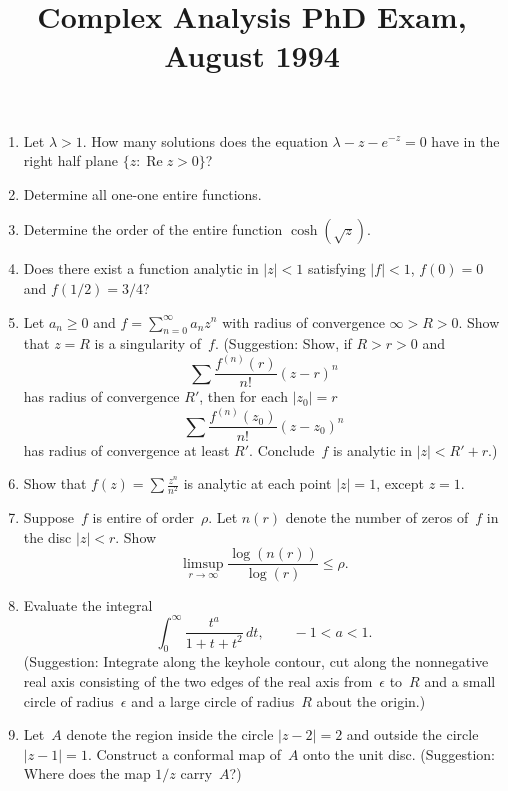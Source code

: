 \documentclass[11pt,letterpaper]{article}
\title{Complex Analysis PhD Exam, August 1994}
\author{}
\date{}
\newenvironment{examproblems}[2]{%
  \def\ProblemHeadingTag{#2}%
  \AssignTaggingSocketPlug{block/list/label}{examproblem}%
  \begin{enumerate}%
  \setcounter{enumi}{#1}%
  \renewcommand{\labelenumi}{\textbf{\theenumi.}}%
  \setlength{\topsep}{0.35em}%
  \setlength{\partopsep}{0pt}%
  \setlength{\itemsep}{0.48em}%
  \setlength{\parsep}{0.18em}%
}{\end{enumerate}}
\begin{document}
\maketitle
\thispagestyle{empty}
\begin{examproblems}{0}{H2}
\def\ProblemHeadingText{Problem 1.}
\item
Let \(\lambda>1\). How many solutions does the equation \(\lambda-z-e^{-z}=0\) have in the right half plane \(\{z:\operatorname{Re}z>0\}\)?
\def\ProblemHeadingText{Problem 2.}
\item
Determine all one-one entire functions.
\def\ProblemHeadingText{Problem 3.}
\item
Determine the order of the entire function \(\cosh(\sqrt{z})\).
\def\ProblemHeadingText{Problem 4.}
\item
Does there exist a function analytic in \(|z|<1\) satisfying \(|f|<1\), \(f(0)=0\) and \(f(1/2)=3/4\)?
\def\ProblemHeadingText{Problem 5.}
\item
Let \(a_n\geq 0\) and \(f=\sum_{n=0}^{\infty}a_nz^n\) with radius of convergence \(\infty>R>0\). Show that \(z=R\) is a singularity of~\(f\). (Suggestion: Show, if \(R>r>0\) and
\[
\sum \frac{f^{(n)}(r)}{n!}(z-r)^n
\]
 has radius of convergence \(R'\), then for each \(|z_0|=r\)
\[
\sum \frac{f^{(n)}(z_0)}{n!}(z-z_0)^n
\]
 has radius of convergence at least \(R'\). Conclude~\(f\) is analytic in \(|z|<R'+r\).)
\def\ProblemHeadingText{Problem 6.}
\item
Show that \(f(z)=\sum \frac{z^n}{n^2}\) is analytic at each point \(|z|=1\), except \(z=1\).
\def\ProblemHeadingText{Problem 7.}
\item
Suppose~\(f\) is entire of order~\(\rho\). Let \(n(r)\) denote the number of zeros of~\(f\) in the disc \(|z|<r\). Show
\[
\limsup_{r\to\infty}\frac{\log(n(r))}{\log(r)}\leq\rho.
\]
\def\ProblemHeadingText{Problem 8.}
\item
Evaluate the integral
\[
\int_0^\infty \frac{t^a}{1+t+t^2}\,dt,\qquad -1<a<1.
\]
 (Suggestion: Integrate along the keyhole contour, cut along the nonnegative real axis consisting of the two edges of the real axis from~\(\epsilon\) to~\(R\) and a small circle of radius~\(\epsilon\) and a large circle of radius~\(R\) about the origin.)
\def\ProblemHeadingText{Problem 9.}
\item
Let~\(A\) denote the region inside the circle \(|z-2|=2\) and outside the circle \(|z-1|=1\). Construct a conformal map of~\(A\) onto the unit disc. (Suggestion: Where does the map \(1/z\) carry~\(A\)?)
\end{examproblems}
\end{document}
